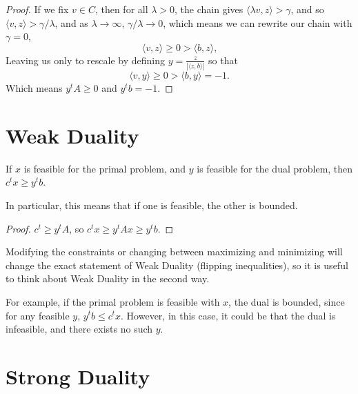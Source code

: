 \documentclass{article}
\begin{document}
\begin{proof}
	If we fix $v \in C$, then for all $\lambda > 0$, the chain gives $\langle \lambda v, z \rangle >
		\gamma$, and so $\langle v, z \rangle > \gamma / \lambda$, and as $\lambda \to \infty$, $\gamma /
		\lambda \to 0$, which means we can rewrite our chain with $\gamma = 0$,
	\[ \langle v, z \rangle \ge 0 > \langle b, z \rangle \text{,} \]
	Leaving us only to rescale by defining $y = \frac{z}{|\langle z, b \rangle|}$ so that
	\[ \langle v, y \rangle \ge 0 > \langle b, y \rangle = -1 \text{.} \]
	Which means $y^t A \ge 0$ and $y^t b = -1$.
\end{proof}

\section{Weak Duality}

\begin{theorem}
	If $x$ is feasible for the primal problem, and $y$ is feasible for the dual problem, then
	$c^t x \ge y^t b$.

	In particular, this means that if one is feasible, the other is bounded.
\end{theorem}
\begin{proof}
	$c^t \ge y^t A$, so $c^t x \ge y^t A x \ge y^t b$.
\end{proof}

Modifying the constraints or changing between maximizing and minimizing will change the exact
statement of Weak Duality (flipping inequalities), so it is useful to think about Weak Duality in
the second way.

For example, if the primal problem is feasible with $x$, the dual is bounded, since for any
feasible $y$, $y^t b \le c^t x$. However, in this case, it could be that the dual is infeasible,
and there exists no such $y$.

\section{Strong Duality}
\end{document}
